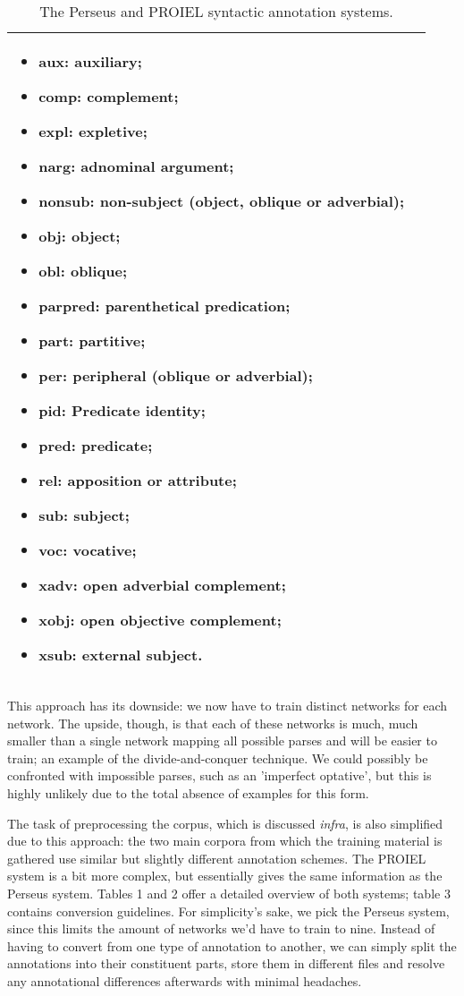 \begin{table}
\begin{tabular}{|l|l|}
\begin{minipage}{2.5in}
\begin{itemize}[noitemsep,topsep=0pt,parsep=0pt,partopsep=0pt]
          \item aux: auxiliary;
          \item comp: complement;
          \item expl: expletive;
          \item narg: adnominal argument;
          \item nonsub: non-subject (object, oblique or adverbial);
          \item obj: object;
          \item obl: oblique;
          \item parpred: parenthetical predication;
          \item part: partitive;
          \item per: peripheral (oblique or adverbial);
          \item pid: Predicate identity;
          \item pred: predicate;
          \item rel: apposition or attribute;
          \item sub: subject;
          \item voc: vocative;
          \item xadv: open adverbial complement;
          \item xobj: open objective complement;
          \item xsub: external subject.
          \end{itemize}
        \end{minipage} \\ \hline
    \end{tabular}
\caption{The Perseus and PROIEL syntactic annotation systems.} \label{table:proielmorph}
\end{table}

This approach has its downside: we now have to train distinct networks
for each network. The upside, though, is that each of these networks
is much, much smaller than a single network mapping all possible
parses and will be easier to train; an example of the
divide-and-conquer technique. We could possibly be confronted with
impossible parses, such as an 'imperfect optative', but this is highly
unlikely due to the total absence of examples for this form.

The task of preprocessing the corpus, which is discussed
\textit{infra}, is also simplified due to this approach: the two main
corpora from which the training material is gathered use similar but
slightly different annotation schemes. The PROIEL system is a bit more
complex, but essentially gives the same information as the Perseus
system. Tables 1 and 2 offer a detailed overview of both systems;
table 3 contains conversion guidelines. For simplicity's sake, we pick
the Perseus system, since this limits the amount of networks we'd have
to train to nine. Instead of having to convert from one type of
annotation to another, we can simply split the annotations into their
constituent parts, store them in different files and resolve any
annotational differences afterwards with minimal headaches.

